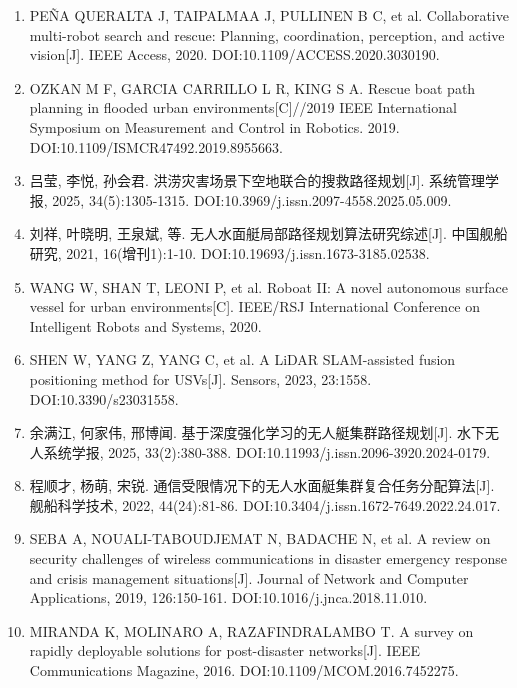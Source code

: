 \documentclass[UTF8,a4paper,zihao=-4]{ctexart}
\begin{document}
\begin{enumerate}
\item PEÑA QUERALTA J, TAIPALMAA J, PULLINEN B C, et al. Collaborative multi-robot search and rescue: Planning, coordination, perception, and active vision[J]. IEEE Access, 2020. DOI:10.1109/ACCESS.2020.3030190.

\item OZKAN M F, GARCIA CARRILLO L R, KING S A. Rescue boat path planning in flooded urban environments[C]//2019 IEEE International Symposium on Measurement and Control in Robotics. 2019. DOI:10.1109/ISMCR47492.2019.8955663.

\item 吕莹, 李悦, 孙会君. 洪涝灾害场景下空地联合的搜救路径规划[J]. 系统管理学报, 2025, 34(5):1305-1315. DOI:10.3969/j.issn.2097-4558.2025.05.009.

\item 刘祥, 叶晓明, 王泉斌, 等. 无人水面艇局部路径规划算法研究综述[J]. 中国舰船研究, 2021, 16(增刊1):1-10. DOI:10.19693/j.issn.1673-3185.02538.

\item WANG W, SHAN T, LEONI P, et al. Roboat II: A novel autonomous surface vessel for urban environments[C]. IEEE/RSJ International Conference on Intelligent Robots and Systems, 2020.

\item SHEN W, YANG Z, YANG C, et al. A LiDAR SLAM-assisted fusion positioning method for USVs[J]. Sensors, 2023, 23:1558. DOI:10.3390/s23031558.

\item 余满江, 何家伟, 邢博闻. 基于深度强化学习的无人艇集群路径规划[J]. 水下无人系统学报, 2025, 33(2):380-388. DOI:10.11993/j.issn.2096-3920.2024-0179.

\item 程顺才, 杨萌, 宋锐. 通信受限情况下的无人水面艇集群复合任务分配算法[J]. 舰船科学技术, 2022, 44(24):81-86. DOI:10.3404/j.issn.1672-7649.2022.24.017.

\item SEBA A, NOUALI-TABOUDJEMAT N, BADACHE N, et al. A review on security challenges of wireless communications in disaster emergency response and crisis management situations[J]. Journal of Network and Computer Applications, 2019, 126:150-161. DOI:10.1016/j.jnca.2018.11.010.

\item MIRANDA K, MOLINARO A, RAZAFINDRALAMBO T. A survey on rapidly deployable solutions for post-disaster networks[J]. IEEE Communications Magazine, 2016. DOI:10.1109/MCOM.2016.7452275.


\end{enumerate}
\end{document}
